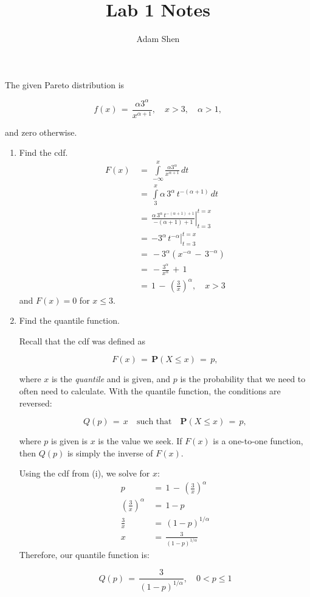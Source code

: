 \documentclass[11pt,letterpaper]{article}
\title{Lab 1 Notes}
\author{Adam Shen}
\date{}
\newcommand{\Prob}[1]{\mathbf{P}\left(#1\right)}
\newcommand{\blue}[1]{{\color{blue}#1}}
\begin{document}
\maketitle

The given Pareto distribution is

\[f(x) \,=\, \frac{\alpha 3^{\alpha}}{x^{\alpha+1}}, \quad x > 3, \quad \alpha > 1,\]

and zero otherwise.

\begin{enumerate}[label=(\roman*)]
\item Find the cdf.
\blue{
\begin{align*}
F(x) \,&=\, \int\limits_{-\infty}^{x}\frac{\alpha 3^{\alpha}}{x^{\alpha+1}}\,dt\\[3mm]
\,&=\, \int\limits_{3}^{x}\alpha\,3^{\alpha}\,t^{-(\alpha + 1)}\,dt\\[3mm]
\,&=\, \left. \frac{\alpha\,3^{\alpha}\,t^{-(\alpha + 1) + 1}}{-(\alpha + 1) + 1} \right|_{t=3}^{t=x}\\[3mm]
\,&=\, \left. -3^{\alpha}\,t^{-\alpha}\right|_{t=3}^{t=x}\\[3mm]
\,&=\, -3^{\alpha}(x^{-\alpha} \,-\, 3^{-\alpha})\\[3mm]
\,&=\, -\frac{3^{\alpha}}{x^{\alpha}} \,+\, 1\\[3mm]
\,&=\, 1 \,-\, \left(\frac{3}{x}\right)^{\alpha}, \quad x > 3
\end{align*}
and $F(x) = 0$ for $x \leq 3$.
}

\item Find the quantile function.

Recall that the cdf was defined as

\[F(x) \,=\, \Prob{X \leq x} \,=\, p,\]

where $x$ is the \emph{quantile} and is given, and $p$ is the probability that we need to often
need to calculate. With the quantile function, the conditions are reversed:

\[Q(p) \,=\, x \quad\text{such that}\quad \Prob{X \leq x} \,=\, p,\]

where $p$ is given is $x$ is the value we seek. If $F(x)$ is a one-to-one function, then $Q(p)$ is
simply the inverse of $F(x)$.

\blue{
Using the cdf from (i), we solve for $x$:
\begin{align*}
p \,&=\, 1 \,-\, \left(\frac{3}{x}\right)^{\alpha}\\[3mm]
\left(\frac{3}{x}\right)^{\alpha} \,&=\, 1-p\\[3mm]
\frac{3}{x} \,&=\, (1-p)^{1/\alpha}\\[3mm]
x \,&=\, \frac{3}{(1-p)^{1/\alpha}}
\end{align*}
Therefore, our quantile function is:

\[Q(p) \,=\, \frac{3}{(1-p)^{1/\alpha}}, \quad 0 < p \leq 1\]
}
\end{enumerate}
\end{document}
